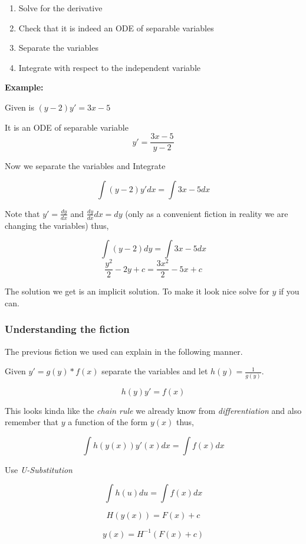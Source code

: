 \begin{enumerate}
    \item Solve for the derivative
    \item Check that it is indeed an ODE of separable variables
    \item Separate the variables
    \item Integrate with respect to the independent variable
\end{enumerate}

\textbf{Example:}
\vspace{\baselineskip}

Given is \((y - 2)y' = 3x - 5\)

It is an ODE of separable variable
\[y' = \frac{3x - 5}{y - 2}\]

Now we separate the variables and Integrate

\[\int (y - 2)y' dx = \int 3x - 5 dx\]

Note that \(y' = \frac{dy}{dx}\) and \( \frac{dy}{dx} dx = dy\) (only as a convenient fiction
in reality we are changing the variables) thus,

\[\int (y - 2)dy = \int 3x - 5 dx\]
\[\frac{y^2}{2} - 2y + c = \frac{3x^2}{2} - 5x + c\]

The solution we get is an implicit solution. To make it look nice solve for \(y\)
if you can.

\subsubsection{Understanding the fiction}

The previous fiction we used can explain in the following manner.
\vspace{\baselineskip}

Given \(y' = g(y)*f(x)\) separate the variables and let \(h(y) = \frac{1}{g(y)}\).

\[h(y)y' = f(x)\]

This looks kinda like the \emph{chain rule} we already know from \emph{differentiation} and
also remember that \(y\) a function of the form \(y(x)\) thus,

\[\int h(y(x)) y'(x)dx = \int f(x) dx\]

Use \emph{U-Substitution}

\[\int h(u) du = \int f(x) dx\]

\[H(y(x)) = F(x) + c\]

\[y(x) = H^{-1}(F(x) + c)\]

\QED

